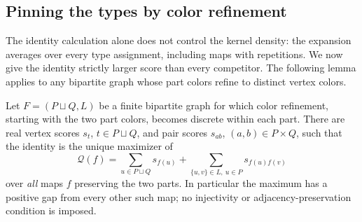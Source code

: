 \subsection{Pinning the types by color refinement}

The identity calculation alone does not control the kernel density:
the expansion averages over every type assignment, including maps with
repetitions. We now give the identity strictly larger score than every
competitor. The following lemma applies to any bipartite graph whose
part colors refine to distinct vertex colors.

\begin{lemma}
\label{lem:pinning}
Let $F=(P\sqcup Q,L)$ be a finite bipartite graph for which color
refinement, starting with the two part colors, becomes discrete within
each part. There are real vertex scores $s_t$, $t\in P\sqcup Q$,
and pair scores $s_{ab}$, $(a,b)\in P\times Q$, such that the identity
is the unique maximizer of
\begin{equation}
 \mathcal Q(f)=\sum_{u\in P\sqcup Q}s_{f(u)}
              +\sum_{\{u,v\}\in L,\ u\in P}s_{f(u)f(v)}
 \label{eq:kernel-pinning-score}
\end{equation}
over \emph{all} maps $f$ preserving the two parts. In particular the
maximum has a positive gap from every other such map; no injectivity
or adjacency-preservation condition is imposed.
\end{lemma}

